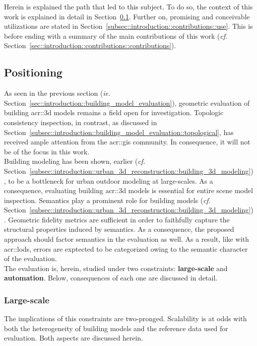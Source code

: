     Herein is explained the path that led to this subject.
    To do so, the context of this work is explained in detail in Section~\ref{subsec::introduction::contributions::positioning}.
    Further on, promising and conceivable utilizations are stated in Section~\ref{subsec::introduction::contributions::use}.
    This is before ending with a summary of the main contributions of this work (\textit{cf.} Section~\ref{sec::introduction::contributions::contributions}).
    
    \subsection{Positioning}
        \label{subsec::introduction::contributions::positioning}
        As seen in the previous section (\textit{ie.} Section~\ref{sec::introduction::building_model_evaluation}), geometric evaluation of building \gls{acr::3d} models remains a field open for investigation.
        Topologic consistency inspection, in contrast, as discussed in Section~\ref{subsec::introduction::building_model_evaluation::topological}, has received ample attention from the \gls{acr::gis} community.
        In consequence, it will not be of the focus in this work.\\

        Building modeling has been shown, earlier (\textit{cf.} Section~\ref{subsec::introduction::urban_3d_reconstruction::building_3d_modeling}), to be a bottleneck for urban outdoor modeling at large-scales.
        As a consequence, evaluating building \gls{acr::3d} models is essential for entire scene model inspection.
        Semantics play a prominent role for building models (\textit{cf.} Section~\ref{subsec::introduction::urban_3d_reconstruction::building_3d_modeling}).
        Geometric fidelity metrics are sufficient in order to faithfully capture the structural properties induced by semantics.
        As a consequence, the proposed approach should factor semantics in the evaluation as well.
        As a result, like with \glspl{acr::lod}, errors are exptected to be categorized owing to the semantic character of the evaluation.\\

        The evaluation is, herein, studied under two constraints: \textbf{large-scale} and \textbf{automation}.
        Below, consequences of each one are discussed in detail.
        \subsubsection{Large-scale}
            The implications of this constraints are two-pronged.
            Scalability is at odds with both the heterogeneity of building models and the reference data used for evaluation.
            Both aspects are discussed herein.\\

